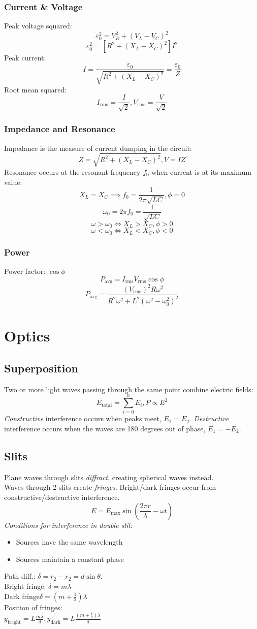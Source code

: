 \subsubsection{Current \& Voltage}
Peak voltage squared:
$$\varepsilon_{\text{0}}^2=V_R^2+(V_L-V_C)^2$$
$$\varepsilon_{\text{0}}^2=[R^2+(X_L-X_C)^2]I^2$$
Peak current:
$$I=\frac{\varepsilon_0}{\sqrt{R^2+(X_L-X_C)^2}}=\frac{\varepsilon_0}{Z}$$
Root mean squared:
$$I_{\text{rms}}=\frac{I}{\sqrt{2}},V_{\text{rms}}=\frac{V}{\sqrt{2}}$$
\subsubsection{Impedance and Resonance}
Impedance is the measure of current dumping in the circuit:
$$Z=\sqrt{R^2+(X_L-X_C)^2}, V=IZ$$
Resonance occurs at the resonant frequency $f_0$ when current is at its maximum value:
$$X_L=X_C\implies f_0 =\frac{1}{2\pi\sqrt{LC}},\phi=0$$
$$\omega_0=2\pi f_0=\frac{1}{\sqrt{LC}}$$
$$\omega>\omega_0\iff X_L>X_C, \phi > 0$$
$$\omega<\omega_0\iff X_L<X_C, \phi < 0$$
\subsubsection{Power}
Power factor: $\cos\phi$
$$P_{\text{avg}}=I_{\text{rms}}V_{\text{rms}}\cos\phi$$
$$P_{\text{avg}}=\frac{(V_{\text{rms}})^2R\omega^2}{R^2\omega^2+L^2(\omega^2-\omega_0^2)^2}$$
\section{Optics}
\subsection{Superposition}
Two or more light waves passing through the same point combine electric fields:
$$E_{\text{total}}=\sum_{i=0}^nE_i,P\propto E^2$$
\emph{Constructive} interference occurs when peaks meet, $E_1=E_2$. \emph{Destructive} interference occurs when the waves are 180 degrees out of phase, $E_1=-E_2$.\\
\subsection{Slits}
Plane waves through slits \emph{diffract}, creating spherical waves instead.\\
Waves through 2 slits create \emph{fringes}. Bright/dark fringes occur from constructive/destructive interference.
$$E=E_{\text{max}}\sin{(\frac{2\pi r}{\lambda}-\omega t)}$$
\emph{Conditions for interference in double slit}:
\begin{itemize}
    \item Sources have the same wavelength
    \item Sources maintain a constant phase
\end{itemize}
Path diff.: $\delta=r_2-r_2=d\sin\theta$.\\
Bright fringe: $\delta=m\lambda$\\
Dark fringe$\delta=(m+\frac{1}{2})\lambda$\\
Position of fringes:\\
$y_{\text{bright}}=L\frac{m\lambda}{d},y_{\text{dark}}=L\frac{(m+\frac{1}{2})\lambda}{d}$
